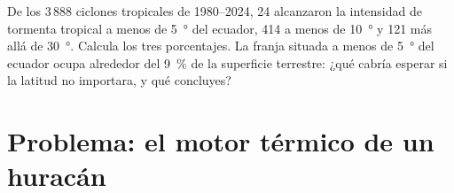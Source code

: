 \begin{exercise}[$\star\star\star$]\label{exo:g10:storms-and-cyclones:15}
De los 3\,888 ciclones tropicales de 1980--2024, 24 alcanzaron la intensidad
de tormenta tropical a menos de \qty{5}{\degree} del ecuador, 414 a menos de
\qty{10}{\degree} y 121 más allá de \qty{30}{\degree}. Calcula los tres
porcentajes. La franja situada a menos de \qty{5}{\degree} del ecuador ocupa
alrededor del \qty{9}{\percent} de la superficie terrestre: ¿qué cabría
esperar si la latitud no importara, y qué concluyes?
\end{exercise}

\section{Problema: el motor térmico de un huracán}


